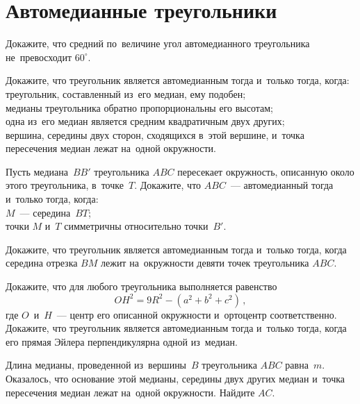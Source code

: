 
\section*{Автомедианные треугольники}


\begin{problems}

\item
Докажите, что средний по~величине угол автомедианного треугольника
не~превосходит $60^{\circ}$.

\item
Докажите, что треугольник является автомедианным тогда и~только тогда, когда:
\\
\subproblem
треугольник, составленный из~его медиан, ему подобен;
\\
\subproblem
медианы треугольника обратно пропорциональны его высотам;
\\
\subproblem
одна из~его медиан является средним квадратичным двух других;
\\
\subproblem
вершина, середины двух сторон, сходящихся в~этой вершине, и~точка пересечения
медиан лежат на~одной окружности.

\item
Пусть медиана~$BB'$ треугольника $ABC$ пересекает окружность, описанную около
этого треугольника, в~точке~$T$.
Докажите, что $ABC$~--- автомедианный тогда и~только тогда, когда:
\\
\subproblem
$M$~--- середина~$BT$;
\\
\subproblem
точки $M$ и~$T$ симметричны относительно точки~$B'$.

\item
Докажите, что треугольник является автомедианным тогда и~только тогда, когда
середина отрезка $BM$ лежит на~окружности девяти точек треугольника $ABC$.

\item
\subproblem
Докажите, что для любого треугольника выполняется равенство
\[
    OH^2 = 9 R^2 - (a^2 + b^2 + c^2)
\, , \]
где $O$~и~$H$~--- центр его описанной окружности и~ортоцентр соответственно.
\\
\subproblem
Докажите, что треугольник является автомедианным тогда и~только тогда, когда
его прямая Эйлера перпендикулярна одной из~медиан.

\item
Длина медианы, проведенной из~вершины~$B$ треугольника $ABC$ равна~$m$.
Оказалось, что основание этой медианы, середины двух других медиан и~точка
пересечения медиан лежат на~одной окружности.
Найдите $AC$.


\end{problems}
